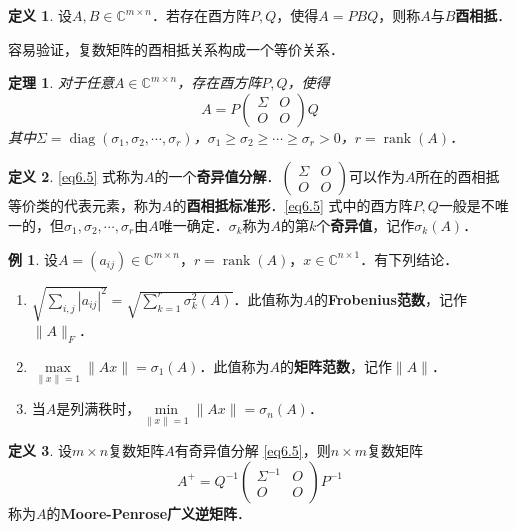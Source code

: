 \documentclass[a4paper,fontset=windows]{ctexbook}
\newtheorem{theorem}{定理}[chapter]
\theoremstyle{definition}
\newtheorem{definition}{定义}[chapter]
\newtheorem{example}{例}[chapter]
\DeclareMathOperator{\diag}{diag}
\DeclareMathOperator{\rank}{rank}
\renewcommand{\ge}{\geqslant}
\begin{document}
\begin{definition}
设$A,B\in\mathbb{C}^{m\times n}$．若存在酉方阵$P,Q$，使得$A=PBQ$，则称$A$与$B${\bf 酉相抵}．
\end{definition}

容易验证，复数矩阵的酉相抵关系构成一个等价关系．

\begin{theorem}\label{thm6.17}
对于任意$A\in\mathbb{C}^{m\times n}$，存在酉方阵$P,Q$，使得
\begin{equation}\label{eq6.5}
A=P\begin{pmatrix}\Sigma&O \\ O&O\end{pmatrix}Q
\end{equation}
其中$\Sigma=\diag(\sigma_1,\sigma_2,\cdots,\sigma_r)$，$\sigma_1\ge\sigma_2\ge\cdots\ge\sigma_r>0$，$r=\rank(A)$．
\end{theorem}

\begin{definition}
\eqref{eq6.5} 式称为$A$的一个{\bf 奇异值分解}．$\begin{pmatrix}\Sigma&O \\ O&O\end{pmatrix}$可以作为$A$所在的酉相抵等价类的代表元素，称为$A$的{\bf 酉相抵标准形}．\eqref{eq6.5} 式中的酉方阵$P,Q$一般是不唯一的，但$\sigma_1,\sigma_2,\cdots,\sigma_r$由$A$唯一确定．$\sigma_k$称为$A$的第$k$个{\bf 奇异值}，记作$\sigma_k(A)$．
\end{definition}

\begin{example}\label{ex6.14}
设$A=(a_{ij})\in\mathbb{C}^{m\times n}$，$r=\rank(A)$，$x\in\mathbb{C}^{n\times 1}$．有下列结论．
\begin{enumerate}
\item $\sqrt{\sum\limits_{i,j}|a_{ij}|^2}=\sqrt{\sum\limits_{k=1}^r\sigma_k^2(A)}$．此值称为$A$的{\bf Frobenius范数}，记作$\|A\|_F$．

\item $\max\limits_{\|x\|=1}\|Ax\|=\sigma_1(A)$．此值称为$A$的{\bf 矩阵范数}，记作$\|A\|$．

\item 当$A$是列满秩时，$\min\limits_{\|x\|=1}\|Ax\|=\sigma_n(A)$．
\end{enumerate}
\end{example}

\begin{definition}\label{def6.13}
设$m\times n$复数矩阵$A$有奇异值分解 \eqref{eq6.5}，则$n\times m$复数矩阵
\begin{equation}\label{eq6.6}
A^+=Q^{-1}\begin{pmatrix}\Sigma^{-1}&O \\ O&O\end{pmatrix}P^{-1}
\end{equation}
称为$A$的{\bf Moore-Penrose广义逆矩阵}．
\end{definition}
\end{document}
